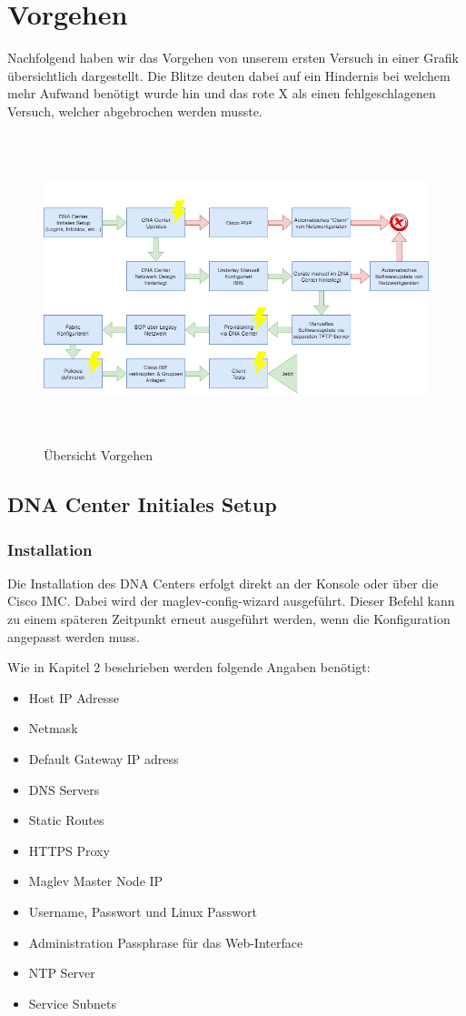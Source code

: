 \section{Vorgehen}
Nachfolgend haben wir das Vorgehen von unserem ersten Versuch in einer Grafik übersichtlich dargestellt. Die Blitze deuten dabei auf ein Hindernis bei welchem mehr Aufwand benötigt wurde hin und das rote X als einen fehlgeschlagenen Versuch, welcher abgebrochen werden musste.
\begin{figure}[H]
	\centering
	\includegraphics[height=9cm]{img/vorgehen.png}
	\caption{Übersicht Vorgehen}
	\label{fig:vorgehen}
\end{figure} 

\subsection{DNA Center Initiales Setup}

\subsubsection{Installation}
\label{DNACenterSetup_Installation}
Die Installation des DNA Centers erfolgt direkt an der Konsole oder über die Cisco IMC. Dabei wird der maglev-config-wizard ausgeführt. Dieser Befehl kann zu einem späteren Zeitpunkt erneut ausgeführt werden, wenn die Konfiguration angepasst werden muss.

Wie in Kapitel 2\cite{cisco-dna-installation-guide} beschrieben werden folgende Angaben benötigt:
\begin{itemize}
	\item Host IP Adresse
	\item Netmask
	\item Default Gateway IP adress
	\item DNS Servers
	\item Static Routes
	\item HTTPS Proxy
	\item Maglev Master Node IP
	\item Username, Passwort und Linux Passwort
	\item Administration Passphrase für das Web-Interface
	\item NTP Server
	\item Service Subnets
\end{itemize}

